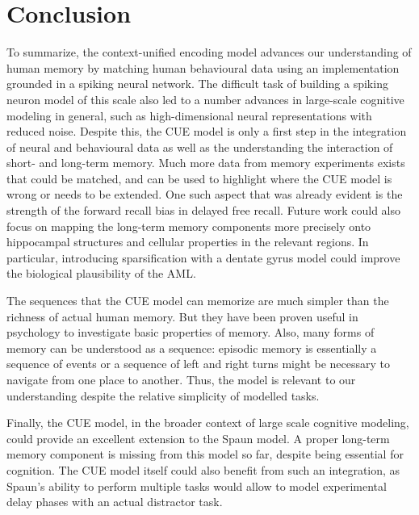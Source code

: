 \chapter{Conclusion}
To summarize, the context-unified encoding model advances our understanding of human memory by matching human behavioural data using an implementation grounded in a spiking neural network.
The difficult task of building a spiking neuron model of this scale also led to a number advances in large-scale cognitive modeling in general, such as high-dimensional neural representations with reduced noise.
Despite this, the CUE model is only a first step in the integration of neural and behavioural data as well as the understanding the interaction of short- and long-term memory.
Much more data from memory experiments exists that could be matched, and can be used to highlight where the CUE model is wrong or needs to be extended.
One such aspect that was already evident is the strength of the forward recall bias in delayed free recall.
Future work could also focus on mapping the long-term memory components more precisely onto hippocampal structures and cellular properties in the relevant regions.
In particular, introducing sparsification with a dentate gyrus model could improve the biological plausibility of the AML\@.

The sequences that the CUE model can memorize are much simpler than the richness of actual human memory.
But they have been proven useful in psychology to investigate basic properties of memory.
Also, many forms of memory can be understood as a sequence:
episodic memory is essentially a sequence of events or a sequence of left and right turns might be necessary to navigate from one place to another.
Thus, the model is relevant to our understanding despite the relative simplicity of modelled tasks.

Finally, the CUE model, in the broader context of large scale cognitive modeling, could provide an excellent extension to the Spaun model.
A proper long-term memory component is missing from this model so far, despite being essential for cognition.
The CUE model itself could also benefit from such an integration, as Spaun's ability to perform multiple tasks would allow to model experimental delay phases with an actual distractor task.
